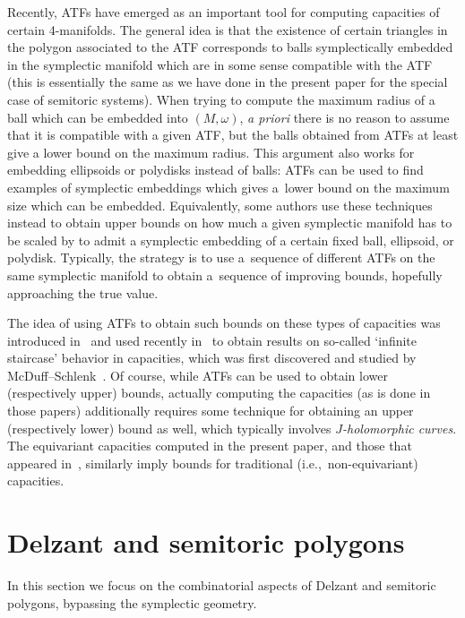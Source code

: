 \documentclass[pdftex]{sigma}
\numberwithin{equation}{section}
\newcommand{\om}{\omega}
\begin{document}
Recently, ATFs have emerged as an important tool for computing capacities of certain 4-manifolds. The general idea is that the existence of certain triangles in the polygon associated to the ATF corresponds to balls symplectically embedded in the symplectic manifold which are in some sense compatible with the ATF (this is essentially the same as we have done in the present paper for the special case of semitoric systems).
When trying to compute the maximum radius of a ball which can be embedded into $(M,\om)$, \emph{a priori} there is no reason to assume that it is compatible with a given ATF, but the balls obtained from ATFs at least give a lower bound on the maximum radius.
This argument also works for embedding ellipsoids or polydisks instead of balls: ATFs can be used to find examples of symplectic embeddings which gives a~lower bound on the maximum size which can be embedded.
Equivalently, some authors use these techniques instead to obtain upper bounds on how much a given symplectic manifold has to be scaled by to admit a symplectic embedding of a certain fixed ball, ellipsoid, or polydisk.
Typically, the strategy is to use a~sequence of different ATFs on the same symplectic manifold to obtain a~sequence of improving bounds, hopefully approaching the true value.

The idea of using ATFs to obtain such bounds on these types of capacities was introduced in~\cite{CV,CGHMP} and used recently in~\cite{four-periodic,macgill,MMW-staircasepatterns} to obtain results on so-called `infinite staircase' behavior in capacities, which was first discovered and studied by McDuff--Schlenk~\cite{MS12}. Of course, while ATFs can be used to obtain lower (respectively upper) bounds, actually computing the capacities (as is done in those papers) additionally requires some technique for obtaining an upper (respectively lower) bound as well, which typically involves \emph{$J$-holomorphic curves}.
The equivariant capacities computed in the present paper, and those that appeared in~\cite{FiPaPe2016}, similarly imply bounds for traditional (i.e.,~non-equivariant) capacities.


\section{Delzant and semitoric polygons}
\label{sec:polygons-intro}

In this section we focus on the combinatorial aspects of Delzant and semitoric polygons, bypassing the symplectic geometry.
\end{document}
